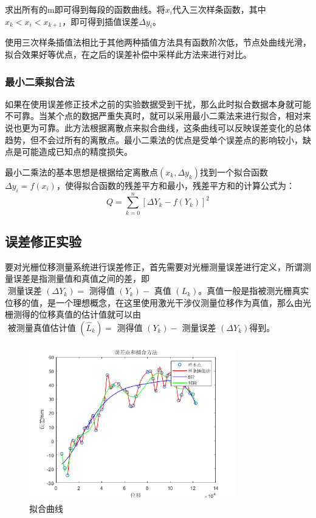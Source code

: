 \documentclass[type=master,oneside]{fduthesis}
\begin{document}
求出所有的m即可得到每段的函数曲线。将$x_i$代入三次样条函数，其中$x_k<x_i<x_{k+1}$，即可得到插值误差$\Delta y_i$。

使用三次样条插值法相比于其他两种插值方法具有函数阶次低，节点处曲线光滑，拟合效果好等优点，在之后的误差补偿中采样此方法来进行对比。

\subsubsection{最小二乘拟合法}
如果在使用误差修正技术之前的实验数据受到干扰，那么此时拟合数据本身就可能不可靠。当某个点的数据严重失真时，就可以采用最小二乘法来进行拟合，相对来说也更为可靠。此方法根据离散点来拟合曲线，这条曲线可以反映误差变化的总体趋势，但不会过所有的离散点。最小二乘法的优点是受单个误差点的影响较小，缺点是可能造成已知点的精度损失。

最小二乘法的基本思想是根据给定离散点$(x_k,\Delta y_k)$找到一个拟合函数$\Delta y_i = f(x_i)$，使得拟合函数的残差平方和最小，残差平方和的计算公式为：
\begin{equation}
  Q=\sum_{k=0}^n\left[\Delta Y_k-f\left(Y_k\right)\right]^2
\end{equation}

\subsection{误差修正实验}
要对光栅位移测量系统进行误差修正，首先需要对光栅测量误差进行定义，所谓测量误差是指测量值和真值之间的差，即$\text { 测量误差 }\left(\Delta Y_k\right)=\text { 测得值 }\left(Y_k\right)-\text { 真值 }\left(L_k\right)$。真值一般是指被测光栅真实位移的值，是一个理想概念，在这里使用激光干涉仪测量位移作为真值，那么由光栅测得的位移真值的估计值就可以由$\text { 被测量真值估计值 }\left(\hat{L}_k\right)=\text { 测得值 }\left(Y_k\right)-\text { 测量误差 }\left(\Delta Y_k\right)$得到。

\begin{figure}[H]
  \centering
  \includegraphics[width=0.8\textwidth]{5-fig//拟合曲线.png}
  \caption{拟合曲线}
  \label{fig:拟合曲线}
\end{figure}
\end{document}
